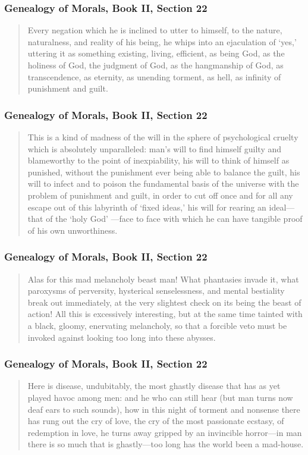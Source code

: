 \documentclass[xcolor=dvipsnames]{beamer}
\begin{document}
\begin{frame}
  \frametitle{Genealogy of Morals, Book II, Section 22}
  \begin{quote}
    Every negation which he is inclined to utter to himself, to the
    nature, naturalness, and reality of his being, he whips into an
    ejaculation of `yes,' uttering it as something existing, living,
    efficient, as being God, as the holiness of God, the judgment of
    God, as the hangmanship of God, as transcendence, as eternity, as
    unending torment, as hell, as infinity of punishment and guilt.
  \end{quote}
\end{frame}

\begin{frame}
  \frametitle{Genealogy of Morals, Book II, Section 22}
  \begin{quote}
    This is a kind of madness of the will in the sphere of
    psychological cruelty which is absolutely unparalleled: man's will
    to find himself guilty and blameworthy to the point of
    inexpiability, his will to think of himself as punished, without
    the punishment ever being able to balance the guilt, his will to
    infect and to poison the fundamental basis of the universe with
    the problem of punishment and guilt, in order to cut off once and
    for all any escape out of this labyrinth of `fixed ideas,' his
    will for rearing an ideal---that of the `holy God' ---face to face
    with which he can have tangible proof of his own unworthiness.
  \end{quote}
\end{frame}

\begin{frame}
  \frametitle{Genealogy of Morals, Book II, Section 22}
  \begin{quote}
    Alas for this mad melancholy beast man! What phantasies invade it,
    what paroxysms of perversity, hysterical senselessness, and mental
    bestiality break out immediately, at the very slightest check on
    its being the beast of action! All this is excessively
    interesting, but at the same time tainted with a black, gloomy,
    enervating melancholy, so that a forcible veto must be invoked
    against looking too long into these abysses.
  \end{quote}
\end{frame}

\begin{frame}
  \frametitle{Genealogy of Morals, Book II, Section 22}
  \begin{quote}
    Here is disease, undubitably, the most ghastly disease that has as
    yet played havoc among men: and he who can still hear (but man
    turns now deaf ears to such sounds), how in this night of torment
    and nonsense there has rung out the cry of love, the cry of the
    most passionate ecstasy, of redemption in love, he turns away
    gripped by an invincible horror---in man there is so much that is
    ghastly---too long has the world been a mad-house.
  \end{quote}
\end{frame}
\end{document}
